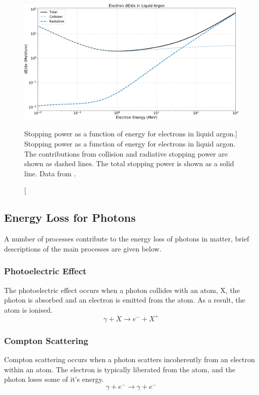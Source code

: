 \begin{figure}

	\centering

	\includegraphics[width=\textwidth]{figures/electron_dedx_argon.pdf}

	\caption
	[Stopping power as a function of energy for electrons in liquid argon.]
	{Stopping power as a function of energy for electrons in liquid argon. The
	contributions from collision and radiative stopping power are shown as dashed
	lines. The total stopping power is shown as a solid line. Data from 
	\cite{estar}.}

	\label{fig:electron_dedx}

\end{figure}

\subsection{Energy Loss for Photons}
A number of processes contribute to the energy loss of photons in matter, brief 
descriptions of the main processes are given below.

\subsubsection*{Photoelectric Effect}
The photoelectric effect occurs when a photon collides with an atom, X, the
photon is absorbed and an electron is emitted from the atom. As a result, the 
atom is ionised. 
\begin{equation*}
	\gamma + X \rightarrow e^- + X^+
\end{equation*}

\subsubsection*{Compton Scattering}
Compton scattering occurs when a photon scatters incoherently from an electron
within an atom. The electron is typically liberated from the atom, and the
photon loses some of it's energy.
\begin{equation*}
	\gamma + e^- \rightarrow \gamma + e^-
\end{equation*}


